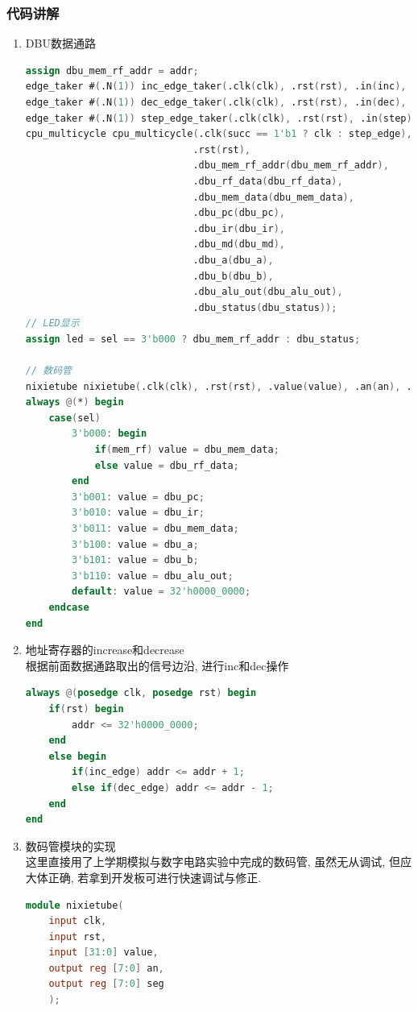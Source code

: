 \documentclass[UTF8]{article}
\begin{document}
\subsubsection{代码讲解}
\begin{enumerate}
	\item DBU数据通路
	\begin{lstlisting}[language=verilog]
assign dbu_mem_rf_addr = addr;
edge_taker #(.N(1)) inc_edge_taker(.clk(clk), .rst(rst), .in(inc), .out(inc_edge));
edge_taker #(.N(1)) dec_edge_taker(.clk(clk), .rst(rst), .in(dec), .out(dec_edge));
edge_taker #(.N(1)) step_edge_taker(.clk(clk), .rst(rst), .in(step), .out(step_edge));
cpu_multicycle cpu_multicycle(.clk(succ == 1'b1 ? clk : step_edge),
                             .rst(rst),
                             .dbu_mem_rf_addr(dbu_mem_rf_addr),
                             .dbu_rf_data(dbu_rf_data),
                             .dbu_mem_data(dbu_mem_data),
                             .dbu_pc(dbu_pc),
                             .dbu_ir(dbu_ir),
                             .dbu_md(dbu_md),
                             .dbu_a(dbu_a),
                             .dbu_b(dbu_b),
                             .dbu_alu_out(dbu_alu_out),
                             .dbu_status(dbu_status));
// LED显示
assign led = sel == 3'b000 ? dbu_mem_rf_addr : dbu_status;

// 数码管
nixietube nixietube(.clk(clk), .rst(rst), .value(value), .an(an), .seg(seg));
always @(*) begin
    case(sel)
        3'b000: begin
            if(mem_rf) value = dbu_mem_data;
            else value = dbu_rf_data;
        end
        3'b001: value = dbu_pc;
        3'b010: value = dbu_ir;
        3'b011: value = dbu_mem_data;
        3'b100: value = dbu_a;
        3'b101: value = dbu_b;
        3'b110: value = dbu_alu_out;
        default: value = 32'h0000_0000;
    endcase
end
	\end{lstlisting}
	
	\item 地址寄存器的increase和decrease\\
	根据前面数据通路取出的信号边沿, 进行inc和dec操作
	\begin{lstlisting}[language=verilog]
always @(posedge clk, posedge rst) begin
    if(rst) begin
        addr <= 32'h0000_0000;
    end
    else begin
        if(inc_edge) addr <= addr + 1;
        else if(dec_edge) addr <= addr - 1;
    end
end
	\end{lstlisting}
	
	\item 数码管模块的实现\\
	这里直接用了上学期模拟与数字电路实验中完成的数码管, 虽然无从调试, 但应大体正确, 若拿到开发板可进行快速调试与修正.
	\begin{lstlisting}[language=verilog]
module nixietube(
    input clk,
    input rst,
    input [31:0] value,
    output reg [7:0] an,
    output reg [7:0] seg
    );
    

\end{lstlisting}
\end{enumerate}
\end{document}
